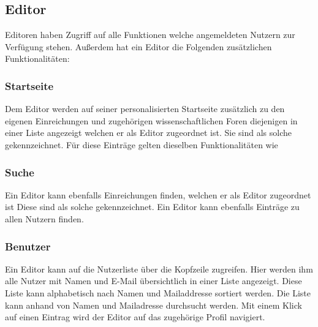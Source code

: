 \subsection{Editor}
Editoren haben Zugriff auf alle Funktionen welche angemeldeten Nutzern zur Verfügung stehen.
Außerdem hat ein Editor die Folgenden zusätzlichen Funktionalitäten:

\subsubsection{Startseite}
\begin{description}
    \XXitem{} Dem Editor werden auf seiner personalisierten Startseite zusätzlich zu den eigenen
    Einreichungen und zugehörigen wissenschaftlichen Foren diejenigen in einer
    Liste angezeigt welchen er als Editor zugeordnet ist. Sie sind als solche gekennzeichnet.
    Für diese Einträge gelten dieselben Funktionalitäten wie  %
\end{description}

\subsubsection{Suche}
\begin{description}
    \XXitem{} Ein Editor kann ebenfalls Einreichungen finden, welchen er als Editor zugeordnet ist
    Diese sind als solche gekennzeichnet.
    \XXitem{} Ein Editor kann ebenfalls Einträge zu allen Nutzern finden.
\end{description}

\subsubsection{Benutzer}
\begin{description}
    \XXitem{} Ein Editor kann auf die Nutzerliste über die Kopfzeile zugreifen.
    \XXitem{} Hier werden ihm alle Nutzer mit Namen und E-Mail übersichtlich in einer Liste angezeigt.
    \XXitem{} Diese Liste kann alphabetisch nach Namen und Mailaddresse sortiert werden.
     Die Liste kann anhand von Namen und Mailadresse durchsucht werden.
    \XXitem{} Mit einem Klick auf einen Eintrag wird der Editor auf das zugehörige Profil navigiert.
\end{description}


